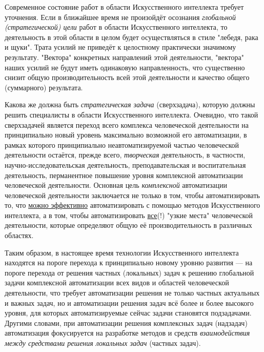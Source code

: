Современное состояние работ в области Искусственного интеллекта требует уточнения. Если в ближайшее время не произойдёт осознания \textit{глобальной (стратегической) цели} работ в области Искусственного интеллекта, то деятельность в этой области в целом будет осуществляться в стиле "лебедя, рака и щуки"{}. Трата усилий не приведёт к целостному практически значимому результату. "Вектора"{} конкретных направлений этой деятельности, "вектора"{} наших усилий не будут иметь одинаковую направленность, что существенно снизит общую  производительность всей этой деятельности и качество общего (суммарного) результата.

Какова же должна быть \textit{стратегическая задача} (сверхзадача), которую должны решить специалисты в области Искусственного интеллекта. Очевидно, что такой сверхзадачей является переход всего комплекса человеческой деятельности на принципиально новый уровень максимально возможной его автоматизации, в рамках которого принципиально неавтоматизируемой частью человеческой деятельности остаётся, прежде всего, \textit{творческая} деятельность, в частности, научно-исследовательская деятельность, преподавательская и воспитательная деятельность, перманентное повышение уровня комплексной автоматизации человеческой деятельности. Основная цель \textit{комплексной} автоматизации человеческой деятельности заключается не только в том, чтобы автоматизировать то, что \uline{можно эффективно} автоматизировать с помощью методов Искусственного интеллекта, а в том, чтобы автоматизировать \uline{все}(!) "узкие места"{} человеческой деятельности, которые определяют общую её производительность в различных областях.

Таким образом, в настоящее время технологии Искусственного интеллекта находятся на пороге перехода к принципиально новому уровню развития --- на пороге перехода от решения частных (локальных) задач к решению глобальной задачи комплексной автоматизации всех видов и областей человеческой деятельности, что требует автоматизации решения не только частных актуальных и важных задач, но и автоматизации решения задач всё более и более высокого уровня, для которых автоматизируемые сейчас задачи становятся подзадачами. Другими словами, при автоматизации решения комплексных задач (надзадач) автоматизация фокусируется на разработке методов и средств \textit{взаимодействия между средствами решения локальных задач} (частных задач).

